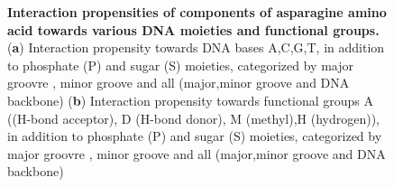 \begin{center}
    \begin{figure}[H]
        \caption[Interaction propensities of components of asparagine amino acid towards various DNA moieties and functional groups]{\textbf{ Interaction propensities of components of asparagine amino acid towards various DNA moieties and functional groups.} ({\bf a}) Interaction  propensity towards DNA bases  A,C,G,T, in addition to phosphate (P) and sugar (S) moieties, categorized by major groovre , minor groove and all (major,minor groove and DNA backbone) ({\bf b}) Interaction  propensity towards functional groups \citep{Chiu2023} A ((H-bond acceptor), D (H-bond donor), M (methyl),H (hydrogen)), in addition to phosphate (P) and sugar (S) moieties, categorized by major groovre , minor groove and all (major,minor groove and DNA backbone)}
  \label{fig:asn}
\end{figure}
\end{center}


